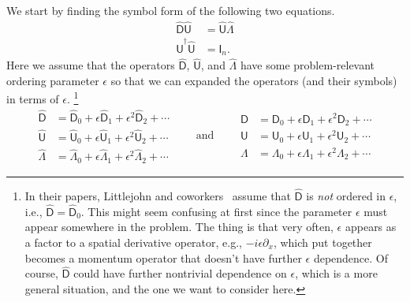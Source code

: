 We start by finding the symbol form of the following two equations.
%
\begin{equation}
  \begin{aligned}
    \widehat{\mathsf{D}}\widehat{\mathsf{U}} &= \widehat{\mathsf{U}}\hat{\Lambda}\\
    \widehat{\mathsf{U}}^{\dagger}\widehat{\mathsf{U}} &= \mathsf{I}_{n}.
  \end{aligned}
\end{equation}
%
Here we assume that the operators $\widehat{\mathsf{D}}$, $\widehat{\mathsf{U}}$, and $\hat{\Lambda}$ have some problem-relevant ordering parameter $\epsilon$ so that we can expanded the operators (and their symbols) in terms of $\epsilon$.%
\footnote{In their papers, Littlejohn and coworkers~\cite{littlejohn1991,weigert1993} assume that $\widehat{\mathsf{D}}$ is \emph{not} ordered in $\epsilon$, i.e., $\widehat{\mathsf{D}} = \widehat{\mathsf{D}}_{0}$.
  This might seem confusing at first since the parameter $\epsilon$ must appear somewhere in the problem.
  The thing is that very often, $\epsilon$ appears as a factor to a spatial derivative operator, e.g., $-i\epsilon\partial_{x}$, which put together becomes a momentum operator that doesn't have further $\epsilon$ dependence.
  Of course, $\widehat{\mathsf{D}}$ could have further nontrivial dependence on $\epsilon$, which is a more general situation, and the one we want to consider here.
}
%
\begin{equation}
  \begin{aligned}
    \widehat{\mathsf{D}} &= \widehat{\mathsf{D}}_{0} + \epsilon\widehat{\mathsf{D}}_{1} + \epsilon^{2}\widehat{\mathsf{D}}_{2} + \cdots\\
    \widehat{\mathsf{U}} &= \widehat{\mathsf{U}}_{0} + \epsilon\widehat{\mathsf{U}}_{1} + \epsilon^{2}\widehat{\mathsf{U}}_{2} + \cdots\\
    \hat{\Lambda} &= \hat{\mathsf\Lambda}_{0} + \epsilon\hat{\mathsf\Lambda}_{1} + \epsilon^{2}\hat{\mathsf\Lambda}_{2} + \cdots
  \end{aligned}
  \qquad\text{and}\qquad
  \begin{aligned}
    {\mathsf{D}} &= {\mathsf{D}}_{0} + \epsilon{\mathsf{D}}_{1} + \epsilon^{2}{\mathsf{D}}_{2} + \cdots\\
    {\mathsf{U}} &= {\mathsf{U}}_{0} + \epsilon{\mathsf{U}}_{1} + \epsilon^{2}{\mathsf{U}}_{2} + \cdots\\
    {\Lambda} &= {\mathsf\Lambda}_{0} + \epsilon{\mathsf\Lambda}_{1} + \epsilon^{2}{\mathsf\Lambda}_{2} + \cdots
  \end{aligned}
\end{equation}
